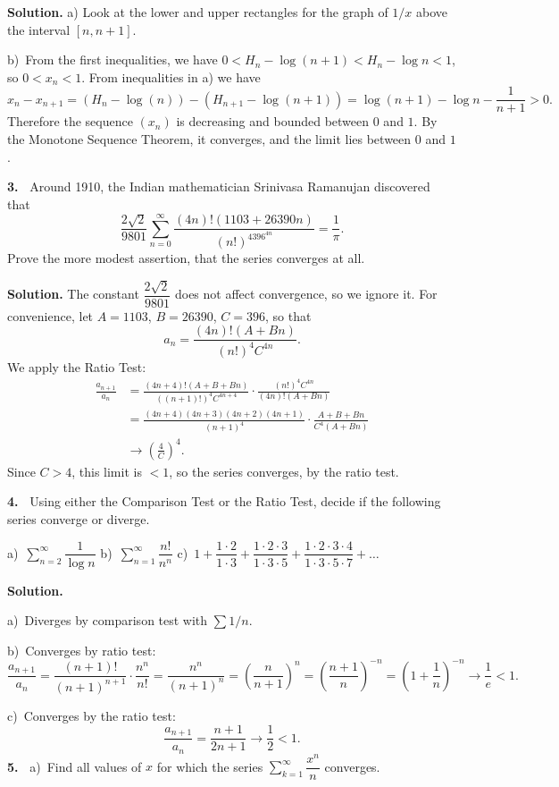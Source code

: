 \documentclass[12pt]{article}
\theoremstyle{definition}
\theoremstyle{remark}
\theoremstyle{definition}
\newenvironment{Solution}{\noindent\textbf{Solution.}}{}
\begin{document}
\begin{Solution} a) Look at the lower and upper rectangles for the graph of $1/x$ above the interval $[n,n+1]$. 

b)\ From the first inequalities, we have $0<H_n-\log(n+1)<H_n-\log n<1$, 
so $0<x_n<1$. From inequalities in a) we have 
\[x_n-x_{n+1}=(H_n-\log(n))-(H_{n+1}-\log(n+1))=\log(n+1)-\log n-\frac{1}{n+1}>0.\]
Therefore the sequence $(x_n)$ is decreasing and bounded between $0$ and $1$. 
By the Monotone Sequence Theorem, it converges, and the limit lies between $0$ and $1$. 


\end{Solution}

{\bf 3.\ } 
Around 1910, the Indian mathematician Srinivasa Ramanujan discovered that
\[
\frac{2\sqrt{2}}{9801}\sum_{n=0}^\infty\frac{(4n)!(1103+26390n)}{(n!)^4396^{4n}}=\frac{1}{\pi}.
\]
Prove the more modest assertion, that the series converges at all.

\begin{Solution} The constant $\dfrac{2\sqrt{2}}{9801}$ does not affect convergence, so we ignore it. For convenience, let $A=1103$, $B=26390$, $C=396$, so that 
\[a_n=\frac{(4n)!(A+Bn)}{(n!)^4C^{4n}}.\]
We apply the Ratio Test:
\[\begin{split}
\frac{a_{n+1}}{a_n}&=\frac{(4n+4)!(A+B+Bn)}{((n+1)!)^4C^{4n+4}}\cdot 
\frac{(n!)^4C^{4n}}{(4n)!(A+Bn)}\\
&=\frac{(4n+4)(4n+3)(4n+2)(4n+1)}{(n+1)^4}\cdot\frac{A+B+Bn}{C^4(A+Bn)}\\
&\to \left(\frac{4}{C}\right)^4.
\end{split}
\]
Since $C>4$, this limit is $<1$, so the series converges, by the ratio test. 
\end{Solution}

{\bf 4.\ } Using either the Comparison Test or the Ratio Test,  decide if the following series converge or diverge. 

a)\ $\sum\limits_{n=2}^\infty \dfrac{1}{\log n}$\qquad\qquad
b)\ $\sum\limits_{n=1}^\infty \dfrac{n!}{n^n}$\qquad\qquad
c)\ $1+\dfrac{1\cdot 2}{1\cdot 3}+\dfrac{1\cdot 2\cdot 3}{1\cdot 3\cdot 5}+
\dfrac{1\cdot 2\cdot 3\cdot 4}{1\cdot 3\cdot 5\cdot7}+\dots$

\begin{Solution} 

a)\ Diverges by comparison test with $\sum 1/n$. 

b)\ Converges by ratio test: 
\[\frac{a_{n+1}}{a_n}=\frac{(n+1)!}{(n+1)^{n+1}}\cdot\frac{ n^n}{n!}
=\frac{n^n}{(n+1)^n}=\left(\frac{n}{n+1}\right)^n=
\left(\frac{n+1}{n}\right)^{-n}=\left(1+\frac{1}{n}\right)^{-n}
\to \frac{1}{e}<1.
\]

c)\ Converges by the ratio test:
\[ 
\frac{a_{n+1}}{a_n}=\frac{n+1}{2n+1}\to \frac{1}{2}<1.\]
\end{Solution}
{\bf 5.\ }
a)\ Find all values of $x$ for which the series $\sum\limits_{k=1}^\infty\dfrac{x^n}{n}$ converges.
\end{document}
